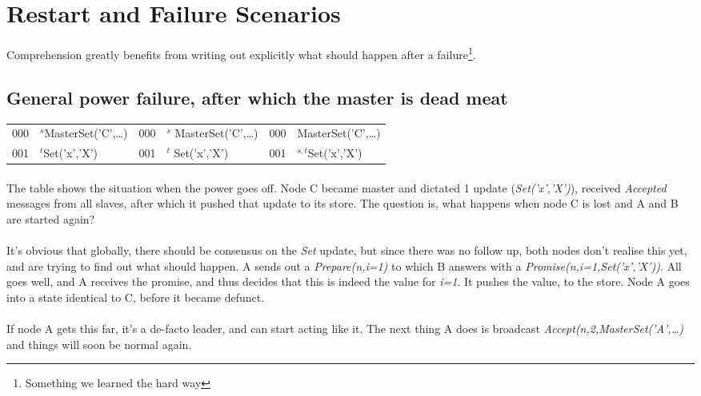 \section{Restart and Failure Scenarios}
Comprehension greatly benefits from writing out explicitly what should happen after a failure\footnote{Something we learned the hard way}.

\subsection{General power failure, after which the master is dead meat}
\begin{supertabular}{|cl|cl|cl|}
  000 & $^s$MasterSet('C',\ldots) & 000 & $^s$ MasterSet('C',\ldots) & 000 & MasterSet('C',\ldots) \\
  001 & $^t$Set('x','X')          & 001 & $^t$ Set('x','X')          & 001 & $^{s,t}$Set('x','X')   \\
\hline
\end{supertabular}
\paragraph{}
The table shows the situation when the power goes off. 
Node C became master and dictated 1 update (\emph{Set('x','X')}), received \emph{Accepted} messages from all slaves,
after which it pushed that update to its store. 
The question is, what happens when node C is lost and A and B are started again?

\paragraph{}
It's obvious that globally, there should be consensus on the \emph{Set} update, but since there was no follow up, 
both nodes don't realise this yet, and are trying to find out what should happen.
A sends out a \emph{Prepare(n,i=1)} to which B answers with a \emph{Promise(n,i=1,Set('x','X'))}.
All goes well, and A receives the promise, and thus decides that this is indeed the value for \emph{i=1}.
It pushes the value, to the store. 
Node A goes into a state identical to C, before it became defunct.
\paragraph{}
If node A gets this far, it's a de-facto leader, and can start acting like it. 
The next thing A does is broadcast \emph{Accept(n,2,MasterSet('A',\ldots)} and things will soon be normal again.

